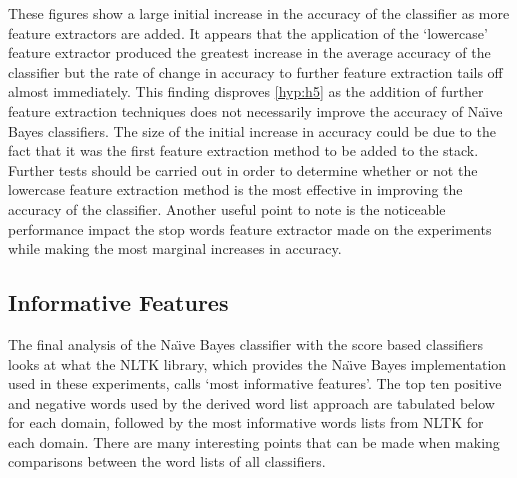 \documentclass{llncs}
\begin{document}
These figures show a large initial increase in the accuracy of the classifier as more feature extractors are added. It appears that the application of the `lowercase' feature extractor produced the greatest increase in the average accuracy of the classifier but the rate of change in accuracy to further feature extraction tails off almost immediately. This finding disproves \ref{hyp:h5} as the addition of further feature extraction techniques does not necessarily improve the accuracy of Na\"\i ve Bayes classifiers. The size of the initial increase in accuracy could be due to the fact that it was the first feature extraction method to be added to the stack. Further tests should be carried out in order to determine whether or not the lowercase feature extraction method is the most effective in improving the accuracy of the classifier. Another useful point to note is the noticeable performance impact the stop words feature extractor made on the experiments while making the most marginal increases in accuracy.

\subsection{Informative Features}

The final analysis of the Na\"\i ve Bayes classifier with the score based classifiers looks at what the NLTK library, which provides the Na\"\i ve Bayes implementation used in these experiments, calls `most informative features'. The top ten positive and negative words used by the derived word list approach are tabulated below for each domain, followed by the most informative words lists from NLTK for each domain. There are many interesting points that can be made when making comparisons between the word lists of all classifiers.
\end{document}
